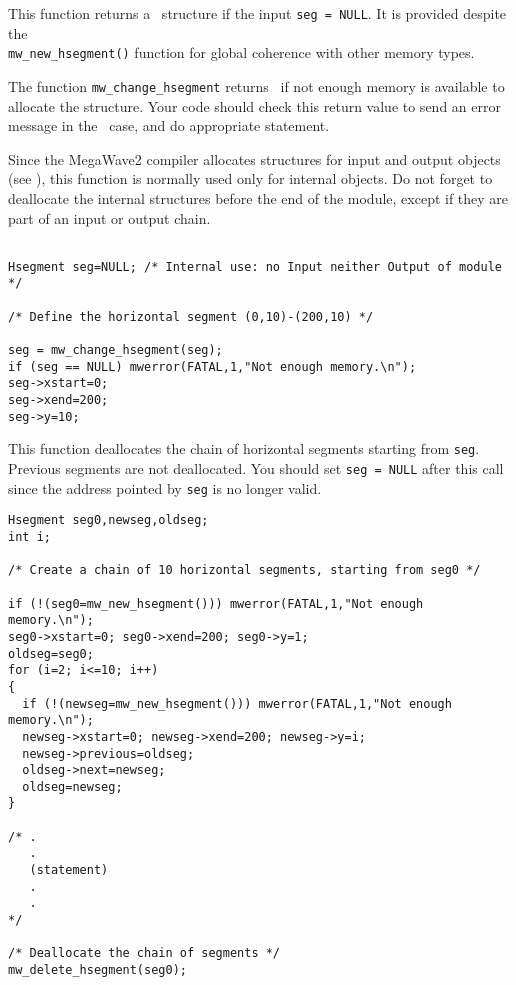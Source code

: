 \Description
This function returns a \hsegment\ structure if the input \verb+seg = NULL+.
It is provided despite the \\
\verb+mw_new_hsegment()+ function for
global coherence with other memory types.

The function \verb+mw_change_hsegment+ returns \Null\ if not enough memory is available to allocate the structure. 
Your code should check this return value to send an error message in the \Null\ case, and do appropriate statement.

Since the MegaWave2 compiler allocates structures for input and output 
objects (see \volI), this function is normally used only for internal objects.
Do not forget to deallocate the internal structures before the end
of the module, except if they are part of an input or output chain.

\Next
\Example
\begin{verbatim}

Hsegment seg=NULL; /* Internal use: no Input neither Output of module */

/* Define the horizontal segment (0,10)-(200,10) */

seg = mw_change_hsegment(seg);
if (seg == NULL) mwerror(FATAL,1,"Not enough memory.\n");
seg->xstart=0; 
seg->xend=200;
seg->y=10;
\end{verbatim}

\newpage %


\Description
This function deallocates the chain of horizontal segments starting
from \verb+seg+. Previous segments are not deallocated.
You should set \verb+seg = NULL+ after this call since the address pointed
by \verb+seg+ is no longer valid.

\Next
\Example
\begin{verbatim}
Hsegment seg0,newseg,oldseg; 
int i;

/* Create a chain of 10 horizontal segments, starting from seg0 */

if (!(seg0=mw_new_hsegment())) mwerror(FATAL,1,"Not enough memory.\n");
seg0->xstart=0; seg0->xend=200; seg0->y=1;
oldseg=seg0;
for (i=2; i<=10; i++)
{
  if (!(newseg=mw_new_hsegment())) mwerror(FATAL,1,"Not enough memory.\n");
  newseg->xstart=0; newseg->xend=200; newseg->y=i;
  newseg->previous=oldseg;
  oldseg->next=newseg;
  oldseg=newseg;
}

/* .
   .
   (statement)
   .
   .
*/

/* Deallocate the chain of segments */
mw_delete_hsegment(seg0);
\end{verbatim}

